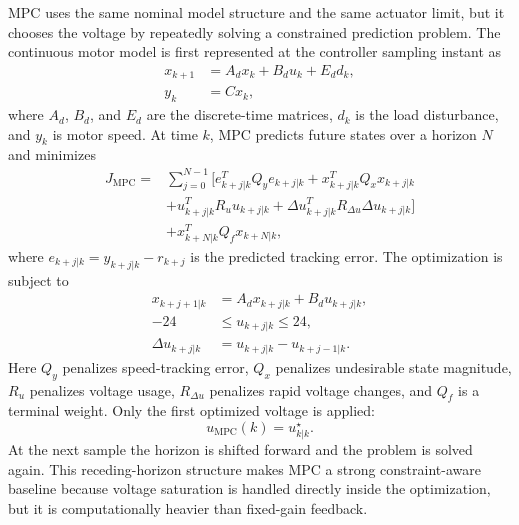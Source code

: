 \documentclass[conference]{IEEEtran}
\begin{document}
MPC uses the same nominal model structure and the same actuator limit, but it chooses the voltage by repeatedly solving a constrained prediction problem. The continuous motor model is first represented at the controller sampling instant as
\begin{align}
x_{k+1} &= A_d x_k + B_d u_k + E_d d_k, \\
y_k &= Cx_k,
\end{align}
where $A_d$, $B_d$, and $E_d$ are the discrete-time matrices, $d_k$ is the load disturbance, and $y_k$ is motor speed. At time $k$, MPC predicts future states over a horizon $N$ and minimizes
\begin{align}
J_{\mathrm{MPC}} =
&\sum_{j=0}^{N-1}
\big[
e_{k+j|k}^T Q_y e_{k+j|k}
+ x_{k+j|k}^T Q_x x_{k+j|k} \nonumber\\
&+ u_{k+j|k}^T R_u u_{k+j|k}
+ \Delta u_{k+j|k}^T R_{\Delta u}\Delta u_{k+j|k}
\big] \nonumber\\
&+ x_{k+N|k}^T Q_f x_{k+N|k},
\end{align}
where $e_{k+j|k}=y_{k+j|k}-r_{k+j}$ is the predicted tracking error.
The optimization is subject to
\begin{align}
x_{k+j+1|k} &= A_d x_{k+j|k}+B_d u_{k+j|k}, \\
-24 &\leq u_{k+j|k} \leq 24, \\
\Delta u_{k+j|k} &= u_{k+j|k}-u_{k+j-1|k}.
\end{align}
Here $Q_y$ penalizes speed-tracking error, $Q_x$ penalizes undesirable state magnitude, $R_u$ penalizes voltage usage, $R_{\Delta u}$ penalizes rapid voltage changes, and $Q_f$ is a terminal weight. Only the first optimized voltage is applied:
\begin{equation}
u_{\mathrm{MPC}}(k)=u_{k|k}^{\star}.
\end{equation}
At the next sample the horizon is shifted forward and the problem is solved again. This receding-horizon structure makes MPC a strong constraint-aware baseline because voltage saturation is handled directly inside the optimization, but it is computationally heavier than fixed-gain feedback.
\end{document}

